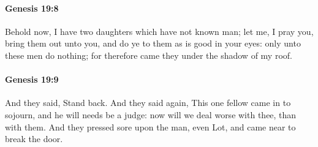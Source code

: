 		\paragraph{Genesis 19:8} %
			\label{GENESIS-19-8}

			Behold now, I have two daughters which have not known man; let me, I pray you, bring them out unto you, and do ye to them as is good in your eyes: only unto these men do nothing; for therefore came they under the shadow of my roof.


		\paragraph{Genesis 19:9} %
			\label{GENESIS-19-9}

			And they said, Stand back. And they said again, This one fellow came in to sojourn, and he will needs be a judge: now will we deal worse with thee, than with them. And they pressed sore upon the man, even Lot, and came near to break the door.

